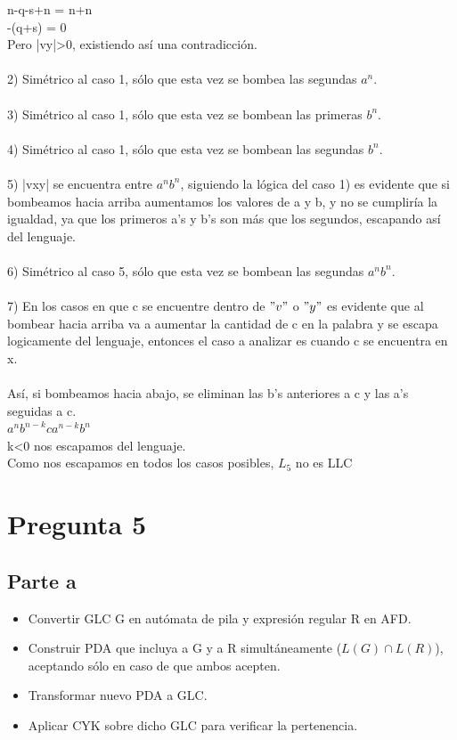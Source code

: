 \documentclass[11pt,letterpaper]{article}
\begin{document}
\indent n-q-s+n = n+n \\
\indent -(q+s) = 0 \\
\indent Pero |vy|>0, existiendo así una contradicción. \\
 \\
2) Simétrico al caso 1, sólo que esta vez se bombea las segundas $a^n$. \\
 \\
3) Simétrico al caso 1, sólo que esta vez se bombean las primeras $b^n$. \\
 \\
4) Simétrico al caso 1, sólo que esta vez se bombean las segundas $b^n$. \\
 \\
5) |vxy| se encuentra entre $a^nb^n$, siguiendo la lógica del caso 1) es evidente que si bombeamos hacia arriba aumentamos los valores de a y b, y no se cumpliría la igualdad, ya que los primeros a's y b's son más que los segundos, escapando así del lenguaje. \\
 \\
6) Simétrico al caso 5, sólo que esta vez se bombean las segundas $a^nb^n$. \\
 \\
7) En los casos en que c se encuentre dentro de $"v"$ o $"y"$ es evidente que al bombear hacia arriba va a aumentar la cantidad de c en la palabra y se escapa logicamente del lenguaje, entonces el caso a analizar es cuando c se encuentra en x. \\
 \\
\indent Así, si bombeamos hacia abajo, se eliminan las b's anteriores a c y las a's seguidas a c. \\
\indent $a^nb^{n-k}ca^{n-k}b^n$ \\
\indent k<0 nos escapamos del lenguaje. \\

\noindent Como nos escapamos en todos los casos posibles, $L_{5}$ no es LLC
  
\section{Pregunta 5}
\subsection{Parte a}
	\begin{itemize}
		\item Convertir GLC G en autómata de pila y expresión regular R en AFD.
		\item Construir PDA que incluya a G y a R simultáneamente ($L(G) \cap L(R)$), aceptando sólo en caso de que ambos acepten.
		\item Transformar nuevo PDA a GLC.
		\item Aplicar CYK sobre dicho GLC para verificar la pertenencia.
	\end{itemize}
\end{document}
